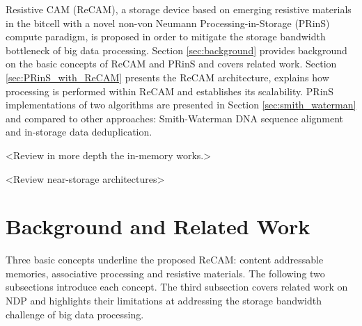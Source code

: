\documentclass{superfri}
\begin{document}
Resistive CAM (ReCAM), a storage device based on emerging resistive materials in the bitcell with a novel non-von Neumann Processing-in-Storage (PRinS) compute paradigm, is proposed in order to mitigate the storage bandwidth bottleneck of big data processing. Section \ref{sec:background} provides background on the basic concepts of ReCAM and PRinS and covers related work. Section \ref{sec:PRinS_with_ReCAM} presents the ReCAM architecture, explains how processing is performed within ReCAM and establishes its scalability. PRinS implementations of two algorithms are presented in Section \ref{sec:smith_waterman} and compared to other approaches: Smith-Waterman DNA sequence alignment and in-storage data deduplication.

<Review in more depth the in-memory works.>

<Review near-storage architectures>

\section{Background and Related Work}
\label{sec:backgroud}
Three basic concepts underline the proposed ReCAM: content addressable memories, associative processing and resistive materials. The following two subsections introduce each concept. The third subsection covers related work on NDP and highlights their limitations at addressing the storage bandwidth challenge of big data processing.
\end{document}
